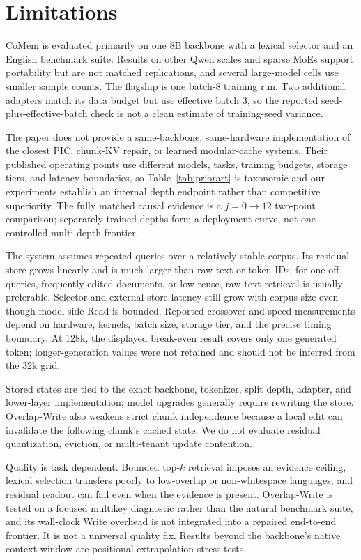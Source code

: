 \section*{Limitations}
\label{sec:limitations}

CoMem is evaluated primarily on one 8B backbone with a lexical selector and an
English benchmark suite. Results on other Qwen scales and sparse MoEs support
portability but are not matched replications, and several large-model cells use
smaller sample counts. The flagship is one batch-8 training run. Two additional
adapters match its data budget but use effective batch 3, so the reported
seed-plus-effective-batch check is not a clean estimate of training-seed
variance.

The paper does not provide a same-backbone, same-hardware implementation of the
closest PIC, chunk-KV repair, or learned modular-cache systems. Their published
operating points use different models, tasks, training budgets, storage tiers,
and latency boundaries, so Table~\ref{tab:priorart} is taxonomic and our
experiments establish an internal depth endpoint rather than competitive
superiority. The fully matched causal evidence is a
$j{=}0\!\rightarrow\!12$ two-point comparison; separately trained depths form a
deployment curve, not one controlled multi-depth frontier.

The system assumes repeated queries over a relatively stable corpus. Its
residual store grows linearly and is much larger than raw text or token IDs;
for one-off queries, frequently edited documents, or low reuse, raw-text
retrieval is usually preferable. Selector and external-store latency still grow
with corpus size even though model-side Read is bounded. Reported crossover and
speed measurements depend on hardware, kernels, batch size, storage tier, and
the precise timing boundary. At 128k, the displayed break-even result covers
only one generated token; longer-generation values were not retained and should
not be inferred from the 32k grid.

Stored states are tied to the exact backbone, tokenizer, split depth, adapter,
and lower-layer implementation; model upgrades generally require rewriting the
store. Overlap-Write also weakens strict chunk independence because a local edit
can invalidate the following chunk's cached state. We do not evaluate residual
quantization, eviction, or multi-tenant update contention.

Quality is task dependent. Bounded top-$k$ retrieval imposes an evidence ceiling,
lexical selection transfers poorly to low-overlap or non-whitespace languages,
and residual readout can fail even when the evidence is present. Overlap-Write
is tested on a focused multikey diagnostic rather than the natural benchmark
suite, and its wall-clock Write overhead is not integrated into a repaired
end-to-end frontier. It is not a universal quality fix. Results beyond the
backbone's native context window are positional-extrapolation stress tests.

